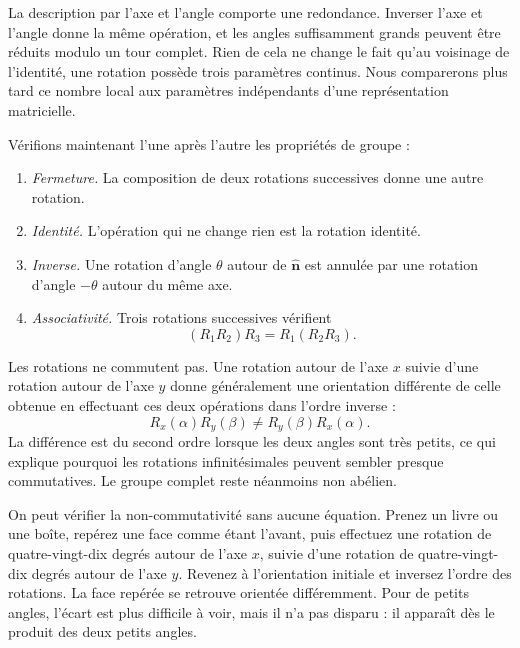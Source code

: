 La description par l’axe et l’angle comporte une redondance. Inverser l’axe et l’angle donne la même opération, et les angles suffisamment grands peuvent être réduits modulo un tour complet. Rien de cela ne change le fait qu’au voisinage de l’identité, une rotation possède trois paramètres continus. Nous comparerons plus tard ce nombre local aux paramètres indépendants d’une représentation matricielle.

Vérifions maintenant l’une après l’autre les propriétés de groupe :
\begin{enumerate}\item \emph{Fermeture.} La composition de deux rotations successives donne une autre rotation.
\item \emph{Identité.} L’opération qui ne change rien est la rotation identité.
\item \emph{Inverse.} Une rotation d’angle \(\theta\) autour de \(\hat{\boldsymbol n}\) est annulée par une rotation d’angle \(-\theta\) autour du même axe.
\item \emph{Associativité.} Trois rotations successives vérifient
\[
(R_1R_2)R_3=R_1(R_2R_3).
\]\end{enumerate}

Les rotations ne commutent pas. Une rotation autour de l’axe \(x\) suivie d’une rotation autour de l’axe \(y\) donne généralement une orientation différente de celle obtenue en effectuant ces deux opérations dans l’ordre inverse :
\begin{equation}
R_x(\alpha)R_y(\beta)\ne R_y(\beta)R_x(\alpha).
\end{equation}
La différence est du second ordre lorsque les deux angles sont très petits, ce qui explique pourquoi les rotations infinitésimales peuvent sembler presque commutatives. Le groupe complet reste néanmoins non abélien.

On peut vérifier la non-commutativité sans aucune équation. Prenez un livre ou une boîte, repérez une face comme étant l’avant, puis effectuez une rotation de quatre-vingt-dix degrés autour de l’axe \(x\), suivie d’une rotation de quatre-vingt-dix degrés autour de l’axe \(y\). Revenez à l’orientation initiale et inversez l’ordre des rotations. La face repérée se retrouve orientée différemment. Pour de petits angles, l’écart est plus difficile à voir, mais il n’a pas disparu : il apparaît dès le produit des deux petits angles.

\begin{classroomqa}\end{classroomqa}

